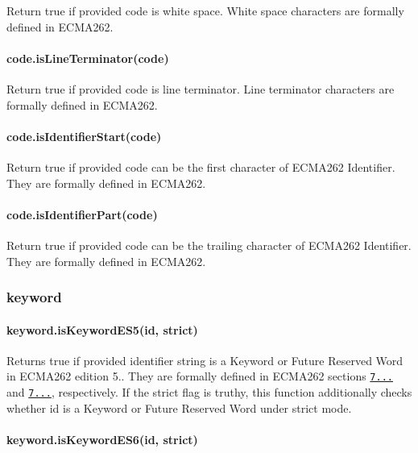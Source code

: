 Return true if provided code is white space. White space characters are formally defined in E\+C\+M\+A262.

\paragraph*{code.\+is\+Line\+Terminator(code)}

Return true if provided code is line terminator. Line terminator characters are formally defined in E\+C\+M\+A262.

\paragraph*{code.\+is\+Identifier\+Start(code)}

Return true if provided code can be the first character of E\+C\+M\+A262 Identifier. They are formally defined in E\+C\+M\+A262.

\paragraph*{code.\+is\+Identifier\+Part(code)}

Return true if provided code can be the trailing character of E\+C\+M\+A262 Identifier. They are formally defined in E\+C\+M\+A262.

\subsubsection*{keyword}

\paragraph*{keyword.\+is\+Keyword\+E\+S5(id, strict)}

Returns {\ttfamily true} if provided identifier string is a Keyword or Future Reserved Word in E\+C\+M\+A262 edition 5.. They are formally defined in E\+C\+M\+A262 sections \href{http://es5.github.io/#x7.6.1.1}{\tt 7...} and \href{http://es5.github.io/#x7.6.1.2}{\tt 7...}, respectively. If the {\ttfamily strict} flag is truthy, this function additionally checks whether {\ttfamily id} is a Keyword or Future Reserved Word under strict mode.

\paragraph*{keyword.\+is\+Keyword\+E\+S6(id, strict)}


